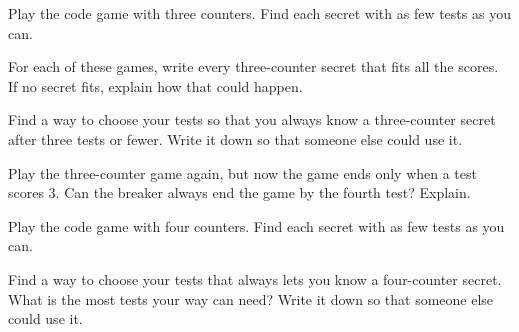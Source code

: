 \vspace{0.1in}
\noindent{}\hfill{}\hfill{}\hfill{}


\newpage

\problem Play the code game with three counters.
Find each secret with as few tests as you can.

\vspace{0.1in}

\newpage

\problem For each of these games, write every three-counter secret that fits all the scores.
If no secret fits, explain how that could happen.

\vspace{0.15in}
\pzsep
{}
\pzsep
{}
\pzsep
{}
\pzsep
{}

\newpage

\problem Find a way to choose your tests so that you always know a three-counter secret after three tests or fewer.
Write it down so that someone else could use it.

\vspace{0.1in}
\noindent{}\hfill{}\hfill{}


\newpage

\problem Play the three-counter game again, but now the game ends only when a test scores 3.
Can the breaker always end the game by the fourth test?
Explain.

\vspace{0.1in}
\noindent{}\hfill{}\hfill{}


\newpage

\problem Play the code game with four counters.
Find each secret with as few tests as you can.

\vspace{0.1in}

\newpage

\problem Find a way to choose your tests that always lets you know a four-counter secret.
What is the most tests your way can need?
Write it down so that someone else could use it.

\vspace{0.1in}
\noindent{}\hfill{}\hfill{}



